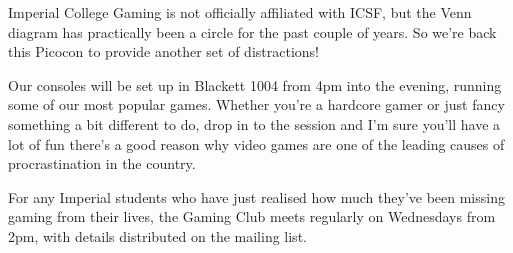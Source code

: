 Imperial College Gaming is not officially affiliated with ICSF, but
the Venn diagram has practically been a circle for the past couple of
years. So we're back this Picocon to provide another set of
distractions!

Our consoles will be set up in Blackett 1004 from 4pm into the
evening, running some of our most popular games. Whether you’re a
hardcore gamer or just fancy something a bit different to do, drop in
to the session and I'm sure you’ll have a lot of fun \textemdash{}
there’s a good reason why video games are one of the leading causes of
procrastination in the country.

For any Imperial students who have just realised how much they’ve been
missing gaming from their lives, the Gaming Club meets regularly on
Wednesdays from 2pm, with details distributed on the mailing list.
